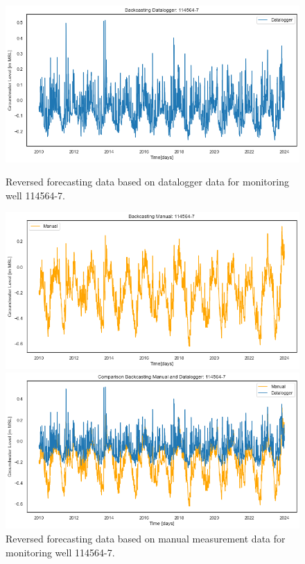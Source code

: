 \begin{figure}[htbp]
    \centering
    \begin{minipage}{0.32\textwidth}
        \centering
        \includegraphics[width=\linewidth]{frontmatter/Rozenburg-fig/pastasdl.png}
        \caption{Reversed forecasting data based on datalogger data for monitoring well 114564-7.}
        \label{dl}
    \end{minipage}
    \hfill
    \begin{minipage}{0.32\textwidth}
        \centering
        \includegraphics[width=\linewidth]{frontmatter/Rozenburg-fig/pastasman.png}
        \caption{Reversed forecasting data based on manual measurement data for monitoring well 114564-7.}
        \label{hp}
    \end{minipage}
    \hfill
    \begin{minipage}{0.32\textwidth}
        \centering
        \includegraphics[width=\linewidth]{frontmatter/Rozenburg-fig/pastascombi.png}

\end{minipage}
\end{figure}
